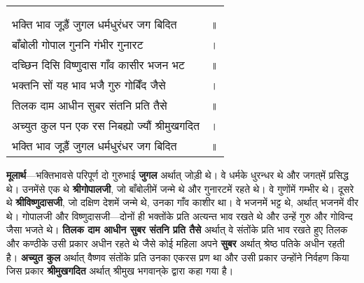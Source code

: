 {
{\bfseries
\setlength{\mylenone}{0pt}
\settowidth{\mylentwo}{}
\setlength{\mylenone}{\maxof{\mylenone}{\mylentwo}}
\settowidth{\mylentwo}{भक्ति भाव जूड़ैं जुगल धर्मधुरंधर जग बिदित}
\setlength{\mylenone}{\maxof{\mylenone}{\mylentwo}}
\settowidth{\mylentwo}{बाँबोली गोपाल गुननि गंभीर गुनारट}
\setlength{\mylenone}{\maxof{\mylenone}{\mylentwo}}
\settowidth{\mylentwo}{दच्छिन दिसि विष्णुदास गाँव कासीर भजन भट}
\setlength{\mylenone}{\maxof{\mylenone}{\mylentwo}}
\settowidth{\mylentwo}{भक्तनि सों यह भाव भजै गुरु गोबिँद जैसे}
\setlength{\mylenone}{\maxof{\mylenone}{\mylentwo}}
\settowidth{\mylentwo}{तिलक दाम आधीन सुबर संतनि प्रति तैसे}
\setlength{\mylenone}{\maxof{\mylenone}{\mylentwo}}
\settowidth{\mylentwo}{अच्युत कुल पन एक रस निबह्यो ज्यौं श्रीमुखगदित}
\setlength{\mylenone}{\maxof{\mylenone}{\mylentwo}}
\settowidth{\mylentwo}{भक्ति भाव जूड़ैं जुगल धर्मधुरंधर जग बिदित}
\setlength{\mylenone}{\maxof{\mylenone}{\mylentwo}}
\setlength{\mylentwo}{\baselineskip}
\setlength{\mylenone}{\mylenone + 1pt}
\begin{longtable}[l]{@{\hspace*{\mylen}}>{\setlength\parfillskip{0pt}}p{\mylenone}@{}@{}l@{}}
 & \\[-\the\mylentwo]
\centering{॥ १५७ \hspace*{-1.5mm}॥} & \\ \nopagebreak
भक्ति भाव जूड़ैं जुगल धर्मधुरंधर जग बिदित & ॥\\
बाँबोली गोपाल गुननि गंभीर गुनारट & ।\\ \nopagebreak
दच्छिन दिसि विष्णुदास गाँव कासीर भजन भट & ॥\\
भक्तनि सों यह भाव भजै गुरु गोबिँद जैसे & ।\\ \nopagebreak
तिलक दाम आधीन सुबर संतनि प्रति तैसे & ॥\\
अच्युत कुल पन एक रस निबह्यो ज्यौं श्रीमुखगदित & ।\\ \nopagebreak
भक्ति भाव जूड़ैं जुगल धर्मधुरंधर जग बिदित & ॥
\end{longtable}
}
}
\begin{sloppypar}\justifying{}
\textbf{मूलार्थ}—भक्तिभावसे परिपूर्ण दो गुरुभाई \textbf{जुगल} अर्थात् जोड़ी थे। वे धर्मके धुरन्धर थे और जगत्‌में प्रसिद्ध थे। उनमेंसे एक थे \textbf{श्रीगोपालजी}, जो बाँबोलीमें जन्मे थे और गुनारटमें रहते थे। वे गुणोंमें गम्भीर थे। दूसरे थे \textbf{श्रीविष्णुदासजी}, जो दक्षिण देशमें जन्मे थे, उनका गाँव काशीर था। वे भजनमें भट्ट थे, अर्थात् भजनमें वीर थे। गोपालजी और विष्णुदासजी—दोनों ही भक्तोंके प्रति अत्यन्त भाव रखते थे और उन्हें गुरु और गोविन्द जैसा भजते थे। \textbf{तिलक दाम आधीन सुबर संतनि प्रति तैसे} अर्थात् वे संतोंके प्रति भाव रखते हुए तिलक और कण्ठीके उसी प्रकार अधीन रहते थे जैसे कोई महिला अपने \textbf{सुबर} अर्थात् श्रेष्ठ पतिके अधीन रहती है। \textbf{अच्युत कुल} अर्थात् वैष्णव संतोंके प्रति उनका एकरस प्रण था और उसी प्रकार उन्होंने निर्वहण किया जिस प्रकार \textbf{श्रीमुखगदित} अर्थात् श्रीमुख भगवान्‌के द्वारा कहा गया है।
\end{sloppypar}

